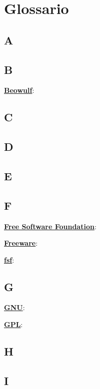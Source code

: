 \section{Glossario}

\subsection{A}

\subsection{B}

\underline{\textbf{Beowulf}}: %

\subsection{C}

\subsection{D}

\subsection{E}

\subsection{F}

\underline{\textbf{Free Software Foundation}}: %

\underline{\textbf{Freeware}}: %

\underline{\textbf{fsf}}: %

\subsection{G}

\underline{\textbf{GNU}}: %

\underline{\textbf{GPL}}: %

\subsection{H}

\subsection{I}

